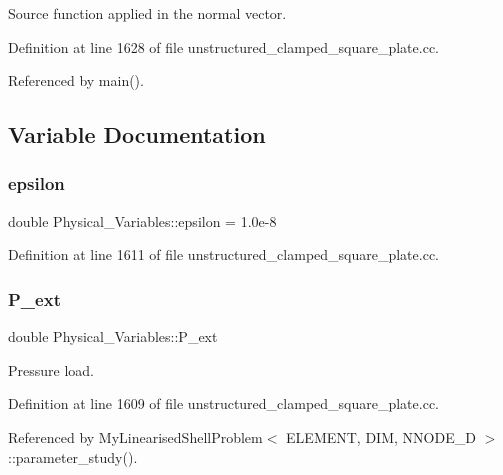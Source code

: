 Source function applied in the normal vector. 



Definition at line 1628 of file unstructured\+\_\+clamped\+\_\+square\+\_\+plate.\+cc.



Referenced by main().



\subsection{Variable Documentation}
\mbox{\label{namespacePhysical__Variables_ac374cc60da0f1e5df3fc48a3c9ce1d74}} 
\subsubsection{\texorpdfstring{epsilon}{epsilon}}
{\footnotesize\ttfamily double Physical\+\_\+\+Variables\+::epsilon = 1.\+0e-\/8}



Definition at line 1611 of file unstructured\+\_\+clamped\+\_\+square\+\_\+plate.\+cc.

\mbox{\label{namespacePhysical__Variables_a58adc76bae4751599143c613f9100904}} 
\subsubsection{\texorpdfstring{P\+\_\+ext}{P\_ext}}
{\footnotesize\ttfamily double Physical\+\_\+\+Variables\+::\+P\+\_\+ext}



Pressure load. 



Definition at line 1609 of file unstructured\+\_\+clamped\+\_\+square\+\_\+plate.\+cc.



Referenced by My\+Linearised\+Shell\+Problem$<$ E\+L\+E\+M\+E\+N\+T, D\+I\+M, N\+N\+O\+D\+E\+\_\+D $>$\+::parameter\+\_\+study().

